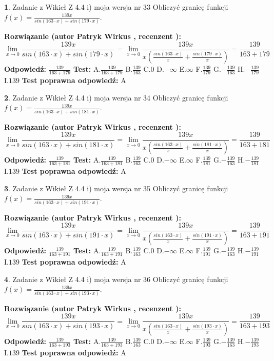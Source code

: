 \documentclass[12pt, a4paper]{article}
\theoremstyle{definition} %
\newtheorem{zad}{}
\newcommand{\zadStart}[1]{\begin{zad}#1\newline}
\newcommand{\zadStop}{\end{zad}}
\newcommand{\rozwStart}[2]{\noindent \textbf{Rozwiązanie (autor #1 , recenzent #2): }\newline}
\newcommand{\rozwStop}{\newline}
\newcommand{\odpStart}{\noindent \textbf{Odpowiedź:}\newline}
\newcommand{\odpStop}{\newline}
\newcommand{\testStart}{\noindent \textbf{Test:}\newline}
\newcommand{\testStop}{\newline}
\newcommand{\kluczStart}{\noindent \textbf{Test poprawna odpowiedź:}\newline}
\newcommand{\kluczStop}{\newline}
\begin{document}
\zadStart{Zadanie z Wikieł Z 4.4 i) moja wersja nr 33}
Obliczyć granicę funkcji $f(x)=\frac{139x}{sin(163\cdot x) +sin(179\cdot x)}$.
\zadStop
\rozwStart{Patryk Wirkus}{}
$$\lim\limits_{x\to 0}\frac{139x}{sin(163\cdot x) +sin(179\cdot x)}=\lim\limits_{x\to 0}\frac{139x}{x(\frac{sin(163\cdot x)}{x}+\frac{sin(179\cdot x)}{x})}=\frac{139}{163+179}$$
\rozwStop
\odpStart
$\frac{139}{163+179}$
\odpStop
\testStart
A.$\frac{139}{163+179}$
B.$\frac{139}{163}$
C.$0$
D.$-\infty$
E.$\infty$
F.$\frac{139}{179}$
G.$-\frac{139}{163}$
H.$-\frac{139}{179}$
I.$139$
\testStop
\kluczStart
A
\kluczStop



\zadStart{Zadanie z Wikieł Z 4.4 i) moja wersja nr 34}
Obliczyć granicę funkcji $f(x)=\frac{139x}{sin(163\cdot x) +sin(181\cdot x)}$.
\zadStop
\rozwStart{Patryk Wirkus}{}
$$\lim\limits_{x\to 0}\frac{139x}{sin(163\cdot x) +sin(181\cdot x)}=\lim\limits_{x\to 0}\frac{139x}{x(\frac{sin(163\cdot x)}{x}+\frac{sin(181\cdot x)}{x})}=\frac{139}{163+181}$$
\rozwStop
\odpStart
$\frac{139}{163+181}$
\odpStop
\testStart
A.$\frac{139}{163+181}$
B.$\frac{139}{163}$
C.$0$
D.$-\infty$
E.$\infty$
F.$\frac{139}{181}$
G.$-\frac{139}{163}$
H.$-\frac{139}{181}$
I.$139$
\testStop
\kluczStart
A
\kluczStop



\zadStart{Zadanie z Wikieł Z 4.4 i) moja wersja nr 35}
Obliczyć granicę funkcji $f(x)=\frac{139x}{sin(163\cdot x) +sin(191\cdot x)}$.
\zadStop
\rozwStart{Patryk Wirkus}{}
$$\lim\limits_{x\to 0}\frac{139x}{sin(163\cdot x) +sin(191\cdot x)}=\lim\limits_{x\to 0}\frac{139x}{x(\frac{sin(163\cdot x)}{x}+\frac{sin(191\cdot x)}{x})}=\frac{139}{163+191}$$
\rozwStop
\odpStart
$\frac{139}{163+191}$
\odpStop
\testStart
A.$\frac{139}{163+191}$
B.$\frac{139}{163}$
C.$0$
D.$-\infty$
E.$\infty$
F.$\frac{139}{191}$
G.$-\frac{139}{163}$
H.$-\frac{139}{191}$
I.$139$
\testStop
\kluczStart
A
\kluczStop



\zadStart{Zadanie z Wikieł Z 4.4 i) moja wersja nr 36}
Obliczyć granicę funkcji $f(x)=\frac{139x}{sin(163\cdot x) +sin(193\cdot x)}$.
\zadStop
\rozwStart{Patryk Wirkus}{}
$$\lim\limits_{x\to 0}\frac{139x}{sin(163\cdot x) +sin(193\cdot x)}=\lim\limits_{x\to 0}\frac{139x}{x(\frac{sin(163\cdot x)}{x}+\frac{sin(193\cdot x)}{x})}=\frac{139}{163+193}$$
\rozwStop
\odpStart
$\frac{139}{163+193}$
\odpStop
\testStart
A.$\frac{139}{163+193}$
B.$\frac{139}{163}$
C.$0$
D.$-\infty$
E.$\infty$
F.$\frac{139}{193}$
G.$-\frac{139}{163}$
H.$-\frac{139}{193}$
I.$139$
\testStop
\kluczStart
A
\kluczStop
\end{document}
